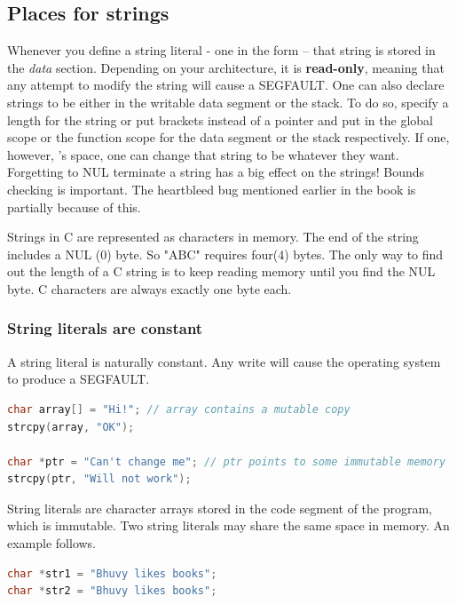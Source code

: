 \subsection{Places for strings}

Whenever you define a string literal - one in the form  -- that string is stored in the \emph{data} section. Depending on your architecture, it is \textbf{read-only}, meaning that any attempt to modify the string will cause a SEGFAULT.
One can also declare strings to be either in the writable data segment or the stack. To do so, specify a length for the string or put brackets instead of a pointer  and put in the global scope or the function scope for the data segment or the stack respectively.
If one, however, 's space, one can change that string to be whatever they want.
Forgetting to NUL terminate a string has a big effect on the strings! Bounds checking is important.
The heartbleed bug mentioned earlier in the book is partially because of this.

Strings in C are represented as characters in memory.
The end of the string includes a NUL (0) byte.
So "ABC" requires four(4) bytes.
The only way to find out the length of a C string is to keep reading memory until you find the NUL byte.
C characters are always exactly one byte each.

\subsubsection{String literals are constant}

A string literal is naturally constant.
Any write will cause the operating system to produce a SEGFAULT. 

\begin{lstlisting}[language=C]
char array[] = "Hi!"; // array contains a mutable copy
strcpy(array, "OK");

char *ptr = "Can't change me"; // ptr points to some immutable memory
strcpy(ptr, "Will not work");
\end{lstlisting}

String literals are character arrays stored in the code segment of the program, which is immutable.
Two string literals may share the same space in memory.
An example follows.

\begin{lstlisting}[language=C]
char *str1 = "Bhuvy likes books";
char *str2 = "Bhuvy likes books";
\end{lstlisting}

